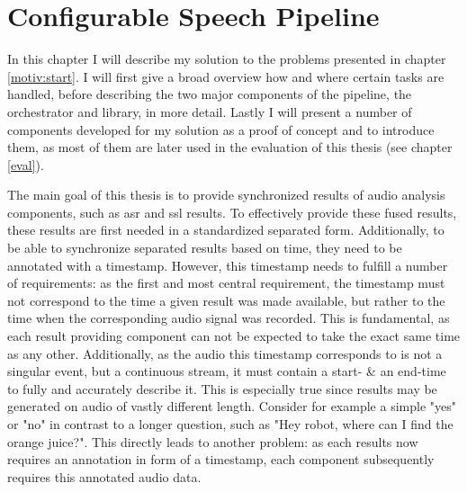 \chapter{Configurable Speech Pipeline}
\label{main:main}
In this chapter I will describe my solution to the problems presented in chapter \ref{motiv:start}.
I will first give a broad overview how and where certain tasks are handled, before describing the two major components of the pipeline, the orchestrator and library, in more detail.
Lastly I will present a number of components developed for my solution as a proof of concept and to introduce them, as most of them are later used in the evaluation of this thesis (see chapter \ref{eval}).

The main goal of this thesis is to provide synchronized results of audio analysis components, such as \gls{asr} and \gls{ssl} results.
To effectively provide these fused results, these results are first needed in a standardized separated form.
Additionally, to be able to synchronize separated results based on time, they need to be annotated with a timestamp.
However, this timestamp needs to fulfill a number of requirements:
as the first and most central requirement, the timestamp must not correspond to the time a given result was made available, but rather to the time when the corresponding audio signal was recorded.
This is fundamental, as each result providing component can not be expected to take the exact same time as any other.
Additionally, as the audio this timestamp corresponds to is not a singular event, but a continuous stream, it must contain a start- \& an end-time to fully and accurately describe it.
This is especially true since results may be generated on audio of vastly different length.
Consider for example a simple "yes" or "no" in contrast to a longer question, such as "Hey robot, where can I find the orange juice?".
This directly leads to another problem:
as each results now requires an annotation in form of a timestamp, each component subsequently requires this annotated audio data.

